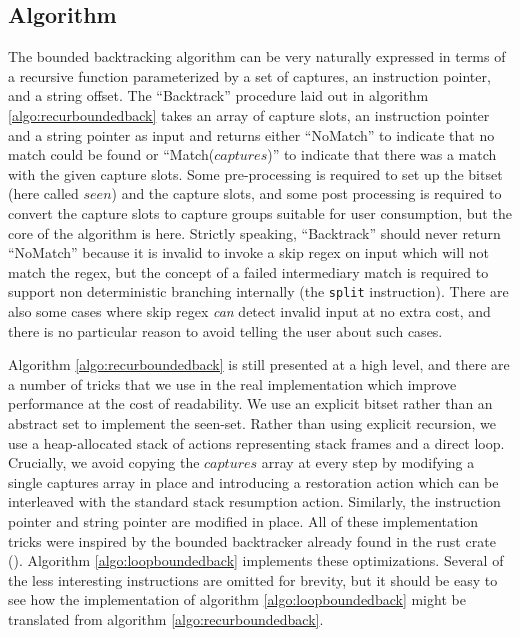 \subsection{Algorithm}

The bounded backtracking algorithm can be very naturally expressed
in terms of a recursive function parameterized by a set of captures,
an instruction pointer, and a string offset.  The ``Backtrack'' procedure
laid out in algorithm \ref{algo:recurboundedback} takes an array of capture
slots, an instruction pointer and a string pointer as input and returns
either ``NoMatch'' to indicate that no match could be found
or ``Match($captures$)'' to indicate that there was a match with the
given capture slots. Some pre-processing is required to
set up the bitset (here called $seen$) and the capture slots,
and some post processing is required to convert the capture slots
to capture groups suitable for user consumption, but the core
of the algorithm is here. Strictly speaking, ``Backtrack'' should
never return ``NoMatch'' because it is invalid to invoke a skip
regex on input which will not match the regex, but the concept of
a failed intermediary match is required to support non deterministic
branching internally (the \verb'split' instruction). There are also
some cases where skip regex \emph{can} detect invalid input at no
extra cost, and there is no particular reason to avoid telling the
user about such cases.

Algorithm \ref{algo:recurboundedback} is still presented at a
high level, and there are a number of tricks that we use in the
real implementation which improve performance at the cost of
readability. We use an explicit bitset rather than an abstract
set to implement the seen-set. Rather than using explicit recursion,
we use a heap-allocated stack of actions representing stack frames
and a direct loop.
Crucially, we avoid copying the $captures$ array at every step by
modifying a single captures array in place and introducing a restoration
action which can be interleaved with the standard stack resumption action.
Similarly, the instruction pointer and string pointer are modified
in place. All of these implementation tricks were inspired by the
bounded backtracker already found in the rust crate (\cite{GallantRegex}).
Algorithm \ref{algo:loopboundedback} implements these
optimizations. Several of the less interesting instructions are
omitted for brevity, but it should be easy to see how the implementation
of algorithm \ref{algo:loopboundedback}
might be translated from algorithm \ref{algo:recurboundedback}.

